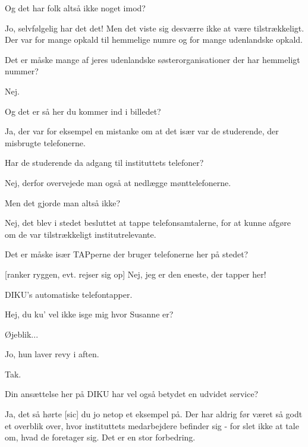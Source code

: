 \documentclass[a4paper,11pt]{article}
\begin{document}
\begin{sketch}
   Og det har folk altså ikke noget imod?

   Jo, selvfølgelig har det det!  Men det viste sig desværre
  ikke at være tilstrækkeligt.  Der var for mange opkald til hemmelige
  numre og for mange udenlandske opkald.

   Det er måske mange af jeres udenlandske
  søsterorganisationer der har hemmeligt nummer?

   Nej.


   Og det er så her du kommer ind i billedet?

   Ja, der var for eksempel en mistanke om at det især var de
  studerende, der misbrugte telefonerne.

   Har de studerende da adgang til instituttets telefoner?

   Nej, derfor overvejede man også at nedlægge mønttelefonerne.

   Men det gjorde man altså ikke?

   Nej, det blev i stedet besluttet at tappe
  telefonsamtalerne, for at kunne afgøre om de var tilstrækkeligt
  institutrelevante.

   Det er måske især TAPperne der bruger telefonerne her på
  stedet?

  [ranker ryggen, evt. rejser sig op] Nej, jeg er den eneste,
  der tapper her!


   DIKU's automatiske telefontapper.

   Hej, du ku' vel ikke isge mig hvor Susanne er?

   Øjeblik... 

   Jo, hun laver revy i aften.

   Tak.


   Din ansættelse her på DIKU har vel også betydet en udvidet service?

   Ja, det så hørte [sic] du jo netop et eksempel på.  Der har
  aldrig før været så godt et overblik over, hvor instituttets
  medarbejdere befinder sig - for slet ikke at tale om, hvad de
  foretager sig.  Det er en stor forbedring.



\end{sketch}
\end{document}
